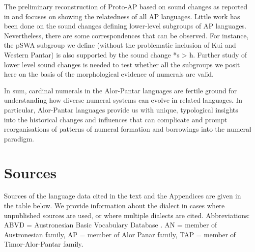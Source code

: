The preliminary reconstruction of Proto-AP based on sound changes as reported in \citet{HoltonEtAl2012} and \citep{HoltonRobinsonTVhistory}focuses on showing the relatedness of all AP languages. Little work has been done on the sound changes defining lower-level subgroups of AP languages. Nevertheless, there are some correspondences that can be observed. For instance, the pSWA subgroup we define (without the problematic inclusion of Kui and Western Pantar) is also supported by the sound change *s {\textgreater} h. Further study of lower level sound changes is needed to test whether all the subgroups we posit here on the basis of the morphological evidence of numerals are valid. 

In sum, cardinal numerals in the Alor-Pantar languages are fertile ground for understanding how diverse numeral systems can evolve in related languages. In particular, Alor-Pantar languages provide us with unique, typological insights into the historical changes and influences that can complicate and prompt reorganisations of patterns of numeral formation and borrowings into the numeral paradigm.


\section{Sources} \label{sec:6:9}
Sources of the language data cited in the text and the Appendices are given in the table below. We provide information about the dialect in cases where unpublished sources are used, or where multiple dialects are cited. Abbreviations: ABVD = Austronesian Basic Vocabulary Database \citep{GreenhillEtAl2005}. AN = member of Austronesian family, AP = member of Alor Panar family, TAP = member of Timor-Alor-Pantar family.





